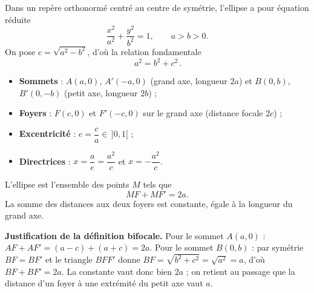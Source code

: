 \begin{theoreme}
Dans un repère orthonormé centré au centre de symétrie, l'ellipse a pour équation réduite
\[
\frac{x^{2}}{a^{2}}+\frac{y^{2}}{b^{2}}=1,\qquad a>b>0.
\]
On pose $c=\sqrt{a^{2}-b^{2}}$, d'où la relation fondamentale
\[
\boxed{\,a^{2}=b^{2}+c^{2}\,}.
\]
\begin{itemize}
\item \textbf{Sommets} : $A(a,0)$, $A'(-a,0)$ (grand axe, longueur $2a$) et $B(0,b)$,
$B'(0,-b)$ (petit axe, longueur $2b$) ;
\item \textbf{Foyers} : $F(c,0)$ et $F'(-c,0)$ sur le grand axe (distance focale $2c$) ;
\item \textbf{Excentricité} : $e=\dfrac ca\in\,]0,1[$ ;
\item \textbf{Directrices} : $x=\dfrac ae=\dfrac{a^{2}}c$ et $x=-\dfrac{a^{2}}c$.
\end{itemize}
\end{theoreme}

\begin{propriete}
L'ellipse est l'ensemble des points $M$ tels que
\[
MF+MF'=2a.
\]
La somme des distances aux deux foyers est constante, égale à la longueur du grand axe.
\end{propriete}

\begin{remarque}
\textbf{Justification de la définition bifocale.} Pour le sommet $A(a,0)$ :
$AF+AF'=(a-c)+(a+c)=2a$. Pour le sommet $B(0,b)$ : par symétrie $BF=BF'$ et le triangle
$BFF'$ donne $BF=\sqrt{b^{2}+c^{2}}=\sqrt{a^{2}}=a$, d'où $BF+BF'=2a$. La constante vaut
donc bien $2a$ ; on retient au passage que la distance d'un foyer à une extrémité du petit
axe vaut $a$.
\end{remarque}

\begin{illus}
\end{illus}

